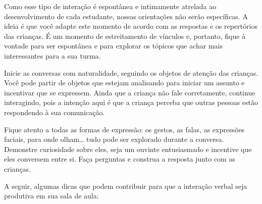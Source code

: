 \documentclass[11pt]{extarticle}
\begin{document}
Como esse tipo de interação é espontânea e intimamente atrelada ao 
desenvolvimento de cada estudante, nossas orientações não serão específicas. 
A ideia é que você adapte este momento de acordo com as respostas e os 
repertórios das crianças. É um momento de estreitamento de vínculos e, portanto, 
fique à vontade para ser espontânea e para explorar os tópicos que achar 
mais interessantes para a sua turma.

Inicie as conversas com naturalidade, seguindo os objetos de atenção das crianças. 
Você pode partir de objetos que estejam analisando
para iniciar um assunto e incentivar que se expressem. Ainda que a
criança não fale corretamente, continue interagindo, 
pois a intenção aqui é que a criança perceba que outras pessoas estão respondendo 
à sua comunicação. 

Fique atento a todas as formas de expressão: os gestos, as falas, as 
expressões faciais, para onde olham\ldots{} tudo pode ser explorado durante a conversa. 
Demonstre curiosidade sobre eles, seja um ouvinte entusiasmado e incentive que eles 
conversem entre si. Faça perguntas e construa a resposta junto com as crianças. 

A seguir, algumas dicas que podem contribuir para que a interação verbal 
seja produtiva em sua sala de aula: 
\end{document}
